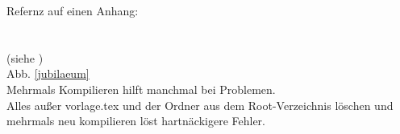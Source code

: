 Refernz auf einen Anhang:\\
\\\\
(siehe )			\\ 	%
Abb. \ref{jubilaeum}					\\	%
Mehrmals Kompilieren hilft manchmal bei Problemen.\\
Alles außer vorlage.tex und der Ordner aus dem Root-Verzeichnis löschen und mehrmals neu kompilieren löst hartnäckigere Fehler.
